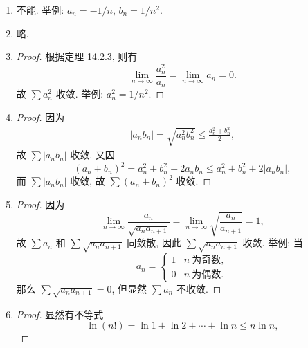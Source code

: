 % 
\begin{enumerate}
    \item %
        不能. 举例: $a_n = -1/n$, $b_n = 1/n^2$.
    \item %
        略.
    \item %
        \begin{proof}
            根据定理 14.2.3, 则有
            \[
                \lim_{n\to\infty}\frac{a_n^2}{a_n} = \lim_{n\to\infty}a_n = 0.    
            \]
            故 $\sum a_n^2$ 收敛. 举例: $a_n^2 = 1/n^2$.
        \end{proof}
    \item %
        \begin{proof}
            因为
            \begin{align*}
                |a_nb_n| = \sqrt{a_n^2b_n^2} \leq \frac{a_n^2 + b_n^2}{2},
            \end{align*}
            故 $\sum|a_nb_n|$ 收敛.
            又因
            \[
                (a_n + b_n)^2 = a_n^2 + b_n^2 + 2a_nb_n \leq a_n^2 + b_n^2 + 2|a_nb_n|,    
            \]
            而 $\sum|a_nb_n|$ 收敛, 故 $\sum(a_n + b_n)^2$ 收敛.
        \end{proof}
    \item %
        \begin{proof}
            因为
            \[
                \lim_{n\to\infty}\frac{a_n}{\sqrt{a_na_{n+1}}} = \lim_{n\to\infty}\sqrt{\frac{a_n}{a_{n+1}}} = 1,   
            \]
            故 $\sum a_n$ 和 $\sum\sqrt{a_na_{n+1}}$ 同敛散, 因此 $\sum\sqrt{a_na_{n+1}}$ 收敛. 举例: 当
            \[
                a_n =
                \begin{cases}
                    1 & n\ \text{为奇数}, \\
                    0 & n\ \text{为偶数}.
                \end{cases}    
            \]
            那么 $\sum\sqrt{a_na_{n+1}} = 0$, 但显然 $\sum a_n$ 不收敛.
        \end{proof}
    \item %
        \begin{proof}
            显然有不等式
            \[
                \ln(n!) = \ln1 + \ln2 + \cdots + \ln{n} \leq n\ln{n},    
            \]

\end{proof}
\end{enumerate}
